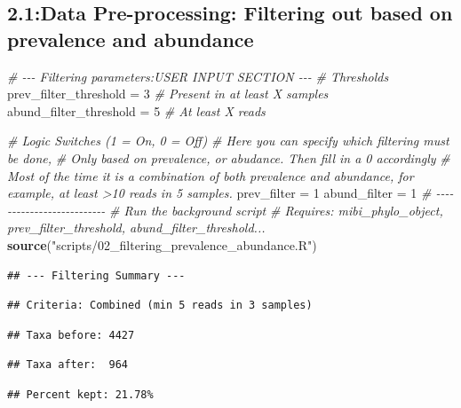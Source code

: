 \documentclass[
]{article}
\newenvironment{Shaded}{\begin{snugshade}}{\end{snugshade}}
\newcommand{\CommentTok}[1]{\textcolor[rgb]{0.56,0.35,0.01}{\textit{#1}}}
\newcommand{\DecValTok}[1]{\textcolor[rgb]{0.00,0.00,0.81}{#1}}
\newcommand{\FunctionTok}[1]{\textcolor[rgb]{0.13,0.29,0.53}{\textbf{#1}}}
\newcommand{\NormalTok}[1]{#1}
\newcommand{\OtherTok}[1]{\textcolor[rgb]{0.56,0.35,0.01}{#1}}
\newcommand{\StringTok}[1]{\textcolor[rgb]{0.31,0.60,0.02}{#1}}
\begin{document}
\subsection{2.1:Data Pre-processing: Filtering out based on prevalence
and
abundance}\label{data-pre-processing-filtering-out-based-on-prevalence-and-abundance}

\begin{Shaded}
\begin{Highlighting}[]
\CommentTok{\# {-}{-}{-} Filtering parameters:USER INPUT SECTION {-}{-}{-}}
\CommentTok{\# Thresholds}
\NormalTok{prev\_filter\_threshold }\OtherTok{=} \DecValTok{3}   \CommentTok{\# Present in at least X samples}
\NormalTok{abund\_filter\_threshold }\OtherTok{=} \DecValTok{5} \CommentTok{\# At least X reads }

\CommentTok{\# Logic Switches (1 = On, 0 = Off)}
  \CommentTok{\# Here you can specify which filtering must be done,}
  \CommentTok{\# Only based on prevalence, or abudance. Then fill in a 0 accordingly}
  \CommentTok{\# Most of the time it is a combination of both prevalence and abundance, for example, at least \textgreater{}10 reads in 5 samples.}
\NormalTok{prev\_filter }\OtherTok{=} \DecValTok{1} 
\NormalTok{abund\_filter }\OtherTok{=} \DecValTok{1}
\CommentTok{\# {-}{-}{-}{-}{-}{-}{-}{-}{-}{-}{-}{-}{-}{-}{-}{-}{-}{-}{-}{-}{-}{-}{-}{-}{-}{-}}
\CommentTok{\# Run the background script}
\CommentTok{\# Requires: mibi\_phylo\_object, prev\_filter\_threshold, abund\_filter\_threshold...}
\FunctionTok{source}\NormalTok{(}\StringTok{"scripts/02\_filtering\_prevalence\_abundance.R"}\NormalTok{)}
\end{Highlighting}
\end{Shaded}

\begin{verbatim}
## --- Filtering Summary ---
\end{verbatim}

\begin{verbatim}
## Criteria: Combined (min 5 reads in 3 samples)
\end{verbatim}

\begin{verbatim}
## Taxa before: 4427
\end{verbatim}

\begin{verbatim}
## Taxa after:  964
\end{verbatim}

\begin{verbatim}
## Percent kept: 21.78%
\end{verbatim}
\end{document}
